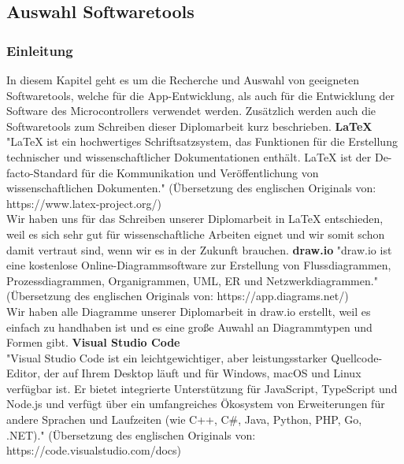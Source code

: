 \documentclass[]{article}
\begin{document}
\subsection{Auswahl Softwaretools}
\subsubsection{Einleitung}
In diesem Kapitel geht es um die Recherche und Auswahl von geeigneten Softwaretools, welche für die App-Entwicklung, als auch für die Entwicklung der Software des Microcontrollers verwendet werden. Zusätzlich werden auch die Softwaretools zum Schreiben dieser Diplomarbeit kurz beschrieben. 
\vspace{4mm}\newline
\textbf{LaTeX} \\
"LaTeX ist ein hochwertiges Schriftsatzsystem, das Funktionen für die Erstellung technischer und wissenschaftlicher Dokumentationen enthält. LaTeX ist der De-facto-Standard für die Kommunikation und Veröffentlichung von wissenschaftlichen Dokumenten." (Übersetzung des englischen Originals von: https://www.latex-project.org/) \\
Wir haben uns für das Schreiben unserer Diplomarbeit in LaTeX entschieden, weil es sich sehr gut für wissenschaftliche Arbeiten eignet und wir somit schon damit vertraut sind, wenn wir es in der Zukunft brauchen.
\vspace{4mm}\newline
\textbf{draw.io}
"draw.io ist eine kostenlose Online-Diagrammsoftware zur Erstellung von Flussdiagrammen, Prozessdiagrammen, Organigrammen, UML, ER und Netzwerkdiagrammen." (Übersetzung des englischen Originals von: https://app.diagrams.net/) \\
Wir haben alle Diagramme unserer Diplomarbeit in draw.io erstellt, weil es einfach zu handhaben ist und es eine große Auwahl an Diagrammtypen und Formen gibt.
\vspace{4mm}\newline
\textbf{Visual Studio Code} \\
"Visual Studio Code ist ein leichtgewichtiger, aber leistungsstarker Quellcode-Editor, der auf Ihrem Desktop läuft und für Windows, macOS und Linux verfügbar ist. Er bietet integrierte Unterstützung für JavaScript, TypeScript und Node.js und verfügt über ein umfangreiches Ökosystem von Erweiterungen für andere Sprachen und Laufzeiten (wie C++, C\#, Java, Python, PHP, Go, .NET)." (Übersetzung des englischen Originals von: https://code.visualstudio.com/docs) \\
\end{document}
